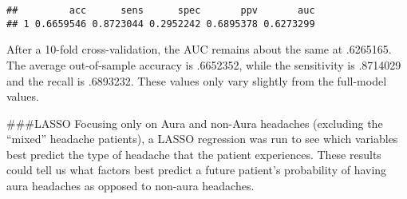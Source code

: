 \documentclass[]{article}
\newenvironment{Shaded}{\begin{snugshade}}{\end{snugshade}}
\newcommand{\ControlFlowTok}[1]{\textcolor[rgb]{0.13,0.29,0.53}{\textbf{#1}}}
\newcommand{\DataTypeTok}[1]{\textcolor[rgb]{0.13,0.29,0.53}{#1}}
\newcommand{\DecValTok}[1]{\textcolor[rgb]{0.00,0.00,0.81}{#1}}
\newcommand{\KeywordTok}[1]{\textcolor[rgb]{0.13,0.29,0.53}{\textbf{#1}}}
\newcommand{\NormalTok}[1]{#1}
\newcommand{\OperatorTok}[1]{\textcolor[rgb]{0.81,0.36,0.00}{\textbf{#1}}}
\newcommand{\OtherTok}[1]{\textcolor[rgb]{0.56,0.35,0.01}{#1}}
\newcommand{\StringTok}[1]{\textcolor[rgb]{0.31,0.60,0.02}{#1}}
\begin{document}
\begin{Shaded}
\end{Shaded}

\begin{verbatim}
##         acc      sens      spec       ppv       auc
## 1 0.6659546 0.8723044 0.2952242 0.6895378 0.6273299
\end{verbatim}

After a 10-fold cross-validation, the AUC remains about the same at
.6265165. The average out-of-sample accuracy is .6652352, while the
sensitivity is .8714029 and the recall is .6893232. These values only
vary slightly from the full-model values.

\#\#\#LASSO Focusing only on Aura and non-Aura headaches (excluding the
``mixed'' headache patients), a LASSO regression was run to see which
variables best predict the type of headache that the patient
experiences. These results could tell us what factors best predict a
future patient's probability of having aura headaches as opposed to
non-aura headaches.
\end{document}

